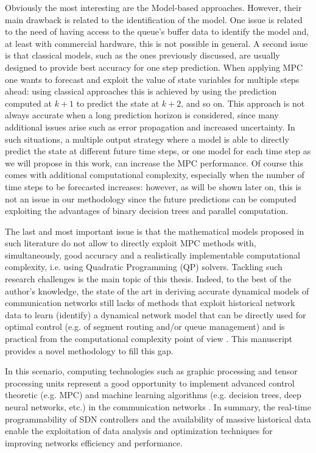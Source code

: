 Obviously the most interesting are the Model-based approaches. However, their main drawback is related to the identification of the model. One issue is related to the need of having access to the queue's buffer data to identify the model and, at least with commercial hardware, this is not possible in general. A second issue is that classical models, such as the ones previously discussed, are usually designed to provide best accuracy for one step prediction. When applying MPC one wants to forecast and exploit the value of state variables for multiple steps ahead: using classical approaches this is achieved by using the prediction computed at $k+1$ to predict the state at $k+2$, and so on. This approach is not always accurate when a long prediction horizon is considered, since many additional issues arise such as error propagation and increased uncertainty. In such situations, a multiple output strategy where a model is able to directly predict the state at different future time steps, or one model for each time step as we will propose in this work, can increase the MPC performance. Of course this comes with additional computational complexity, especially when the number of time steps to be forecasted increases: however, as will be shown later on, this is not an issue in our methodology since the future predictions can be computed exploiting the advantages of binary decision trees and parallel computation.

The last and most important issue is that the mathematical models proposed in such literature do not allow to directly exploit MPC methods with, simultaneously, good accuracy and a realistically implementable computational complexity, i.e. using Quadratic Programming (QP) solvers. Tackling such research challenges is the main topic of this thesis. Indeed, to the best of the author's knowledge, the state of the art in deriving accurate dynamical models of communication networks still lacks of methods that exploit historical network data to learn (identify) a dynamical network model that can be directly used for optimal control (e.g. of segment routing and/or queue management) and is practical from the computational complexity point of view \cite{Neely2010,Lemeshko2019,Kim2019,Aljoby2019,Lebedenko2018,Le2007,SouravGhosh2005}. This manuscript provides a novel methodology to fill this gap.

In this scenario, computing technologies such as graphic processing and tensor processing units represent a good opportunity to implement advanced control theoretic (e.g. MPC) and machine learning algorithms (e.g. decision trees, deep neural networks, etc.) in the communication networks \cite{Wang2018, Usama2017, Xie2019, Xu2018}. In summary, the real-time programmability of SDN controllers and the availability of massive historical data enable the exploitation of data analysis and optimization techniques for improving networks efficiency and performance.


